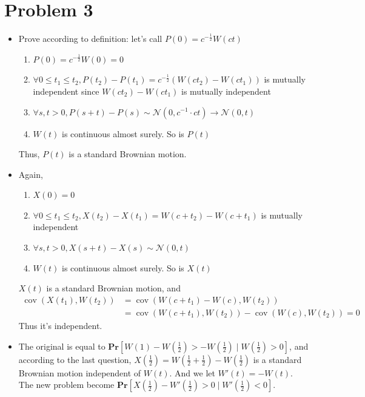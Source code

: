 \documentclass{article}
\theoremstyle{definition}
\begin{document}
	\section*{Problem 3}
	\begin{itemize}
		\item Prove according to definition: let's call $P(0) = c^{-\frac{1}{2}}W(ct)$
		\begin{enumerate}
			\item $P(0) = c^{-\frac{1}{2}}W(0) = 0$
			\item $\forall 0\leq t_1\leq t_2, P(t_2) - P(t_1) = c^{-\frac{1}{2}}(W(ct_2) - W(ct_1))$ is mutually independent since $W(ct_2) - W(ct_1)$ is mutually independent
			\item $\forall s,t > 0, P(s+t) - P(s) \sim \mathcal N(0,c^{-1}\cdot ct) \rightarrow \mathcal N(0,t)$
			\item $W(t)$ is continuous almost surely. So is $P(t)$
		\end{enumerate}
		Thus, $P(t)$ is a standard Brownian motion.
		\item Again, 
		\begin{enumerate}
			\item $X(0) = 0$
			\item $\forall 0\leq t_1\leq t_2, X(t_2) - X(t_1) = W(c+t_2) - W(c+t_1)$ is mutually independent
			\item $\forall s,t > 0, X(s+t) - X(s) \sim \mathcal N(0,t)$
			\item $W(t)$ is continuous almost surely. So is $X(t)$
		\end{enumerate}
		$X(t)$ is a standard Brownian motion, and
		\begin{equation}
			\begin{aligned}
				\operatorname{cov}(X(t_1), W(t_2)) & = \operatorname{cov}(W(c+t_1)-W(c), W(t_2)) \\
				& = \operatorname{cov} (W(c+t_1), W(t_2)) -\operatorname{cov} (W(c), W(t_2)) = 0
			\end{aligned}
		\end{equation}
		Thus it's independent.
		\item The original is equal to $\mathbf{Pr}[W(1)-W(\frac{1}{2})>-W(\frac{1}{2})\mid W(\frac{1}{2})>0]$, and according to the last question, $X(\frac{1}{2}) = W(\frac{1}{2}+\frac{1}{2})-W(\frac{1}{2})$ is a standard Brownian motion independent of $W(t)$. And we let $W'(t) = -W(t)$. The new problem become $\mathbf{Pr}[X(\frac{1}{2})-W'(\frac{1}{2})>0\mid W'(\frac{1}{2})<0]$.
		

\end{itemize}
\end{document}
